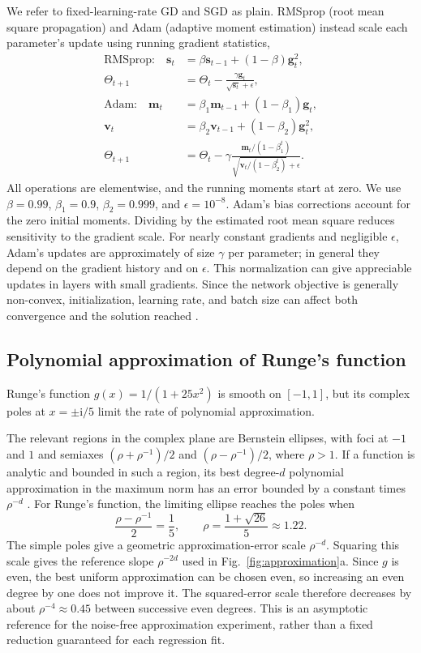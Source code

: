 \documentclass[aps,prb,reprint,superscriptaddress,nofootinbib,longbibliography,floatfix]{revtex4-2}
\begin{document}
We refer to fixed-learning-rate GD and SGD as plain. RMSprop (root mean square propagation) \cite{Tieleman2012} and Adam (adaptive moment estimation) \cite{Kingma2015} instead scale each parameter's update using running gradient statistics,
\begin{align}
\text{RMSprop:}\quad
\bm s_t&=\beta\bm s_{t-1}+(1-\beta)\bm g_t^2,\nonumber\\
\Theta_{t+1}&=\Theta_t-
\frac{\gamma\bm g_t}{\sqrt{\bm s_t}+\epsilon},\nonumber\\[3pt]
\text{Adam:}\quad
\bm m_t&=\beta_1\bm m_{t-1}+(1-\beta_1)\bm g_t,\nonumber\\
\bm v_t&=\beta_2\bm v_{t-1}+(1-\beta_2)\bm g_t^2,\nonumber\\
\Theta_{t+1}&=\Theta_t-\gamma
\frac{\bm m_t/(1-\beta_1^t)}
{\sqrt{\bm v_t/(1-\beta_2^t)}+\epsilon}.
\label{eq:adaptive}
\end{align}
All operations are elementwise, and the running moments start at zero. We use $\beta=0.99$, $\beta_1=0.9$, $\beta_2=0.999$, and $\epsilon=10^{-8}$. Adam's bias corrections account for the zero initial moments. Dividing by the estimated root mean square reduces sensitivity to the gradient scale. For nearly constant gradients and negligible $\epsilon$, Adam's updates are approximately of size $\gamma$ per parameter; in general they depend on the gradient history and on $\epsilon$. This normalization can give appreciable updates in layers with small gradients. Since the network objective is generally non-convex, initialization, learning rate, and batch size can affect both convergence and the solution reached \cite[Sec.~8.15]{HjorthJensen2026}.

\subsection{Polynomial approximation of Runge's function}\label{sec:polyapprox}
Runge's function $g(x)=1/(1+25x^2)$ is smooth on $[-1,1]$, but its complex poles at $x=\pm\mathrm{i}/5$ limit the rate of polynomial approximation.

The relevant regions in the complex plane are Bernstein ellipses, with foci at $-1$ and $1$ and semiaxes $(\rho+\rho^{-1})/2$ and $(\rho-\rho^{-1})/2$, where $\rho>1$. If a function is analytic and bounded in such a region, its best degree-$d$ polynomial approximation in the maximum norm has an error bounded by a constant times $\rho^{-d}$ \cite[Chap.~8]{Trefethen2019}. For Runge's function, the limiting ellipse reaches the poles when
\[
\frac{\rho-\rho^{-1}}{2}=\frac15,
\qquad
\rho=\frac{1+\sqrt{26}}5\approx1.22.
\]
The simple poles give a geometric approximation-error scale $\rho^{-d}$. Squaring this scale gives the reference slope $\rho^{-2d}$ used in Fig.~\ref{fig:approximation}a. Since $g$ is even, the best uniform approximation can be chosen even, so increasing an even degree by one does not improve it. The squared-error scale therefore decreases by about $\rho^{-4}\approx0.45$ between successive even degrees. This is an asymptotic reference for the noise-free approximation experiment, rather than a fixed reduction guaranteed for each regression fit.
\end{document}
